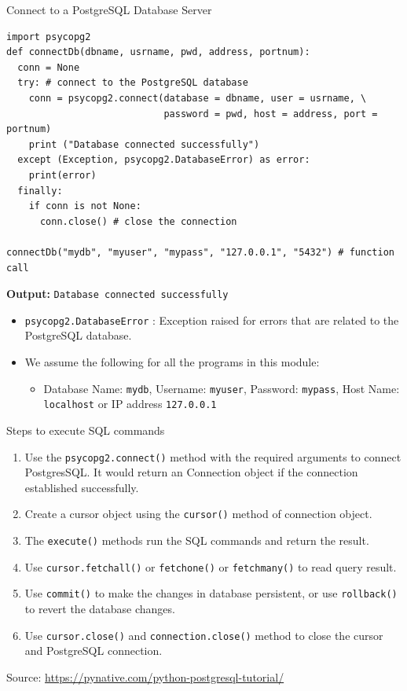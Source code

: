 \documentclass[aspectratio=169, xcolor=dvipsnames]{beamer}
\begin{document}
\begin{frame}[fragile]{Connect to a PostgreSQL Database Server}
    \begin{verbatim}
import psycopg2
def connectDb(dbname, usrname, pwd, address, portnum):
  conn = None
  try: # connect to the PostgreSQL database
    conn = psycopg2.connect(database = dbname, user = usrname, \
                            password = pwd, host = address, port = portnum)
    print ("Database connected successfully")
  except (Exception, psycopg2.DatabaseError) as error:
    print(error)
  finally:
    if conn is not None:
      conn.close() # close the connection

connectDb("mydb", "myuser", "mypass", "127.0.0.1", "5432") # function call
    \end{verbatim}
    \textbf{Output:}
    \texttt{Database connected successfully}
    \begin{itemize}
        \item \texttt{psycopg2.DatabaseError} : Exception raised for errors that are related to the PostgreSQL database.
        \item We assume the following for all the programs in this module:
        \begin{itemize}
            \item Database Name: \texttt{mydb}, Username: \texttt{myuser}, Password: \texttt{mypass}, Host Name: \texttt{localhost} or IP address \texttt{127.0.0.1}
        \end{itemize}
    \end{itemize}
\end{frame}

\begin{frame}{Steps to execute SQL commands}
    \begin{enumerate}
        \item Use the \texttt{psycopg2.connect()} method with the required arguments to connect PostgresSQL. It would return an Connection object if the connection established successfully.
        \item Create a cursor object using the \texttt{cursor()} method of connection object.
        \item The \texttt{execute()} methods run the SQL commands and return the result.
        \item Use \texttt{cursor.fetchall()} or \texttt{fetchone()} or \texttt{fetchmany()} to read query result.
        \item Use \texttt{commit()} to make the changes in database persistent, or use \texttt{rollback()} to revert the database changes.
        \item Use \texttt{cursor.close()} and \texttt{connection.close()} method to close the cursor and PostgreSQL connection.
    \end{enumerate}
    \vspace{1em}
    \small Source: \url{https://pynative.com/python-postgresql-tutorial/}
\end{frame}
\end{document}
